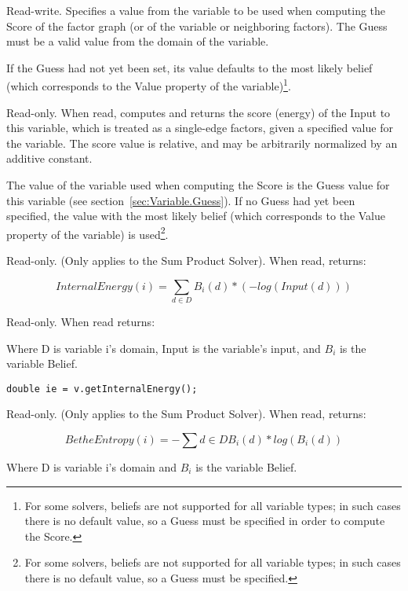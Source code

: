 Read-write.  Specifies a value from the variable to be used when computing the Score of the factor graph (or of the variable or neighboring factors).  The Guess must be a valid value from the domain of the variable.

If the Guess had not yet been set, its value defaults to the most likely belief (which corresponds to the Value property of the variable)\footnote{For some solvers, beliefs are not supported for all variable types; in such cases there is no default value, so a Guess must be specified in order to compute the Score.}.


\label{sec:Variable.Score}

Read-only.  When read, computes and returns the score (energy) of the Input to this variable, which is treated as a single-edge factors, given a specified value for the variable.  The score value is relative, and may be arbitrarily normalized by an additive constant.

The value of the variable used when computing the Score is the Guess value for this variable (see section~\ref{sec:Variable.Guess}).  If no Guess had yet been specified, the value with the most likely belief (which corresponds to the Value property of the variable) is used\footnote{For some solvers, beliefs are not supported for all variable types; in such cases there is no default value, so a Guess must be specified.}.


\label{sec:Variable.InternalEnergy}

Read-only.  (Only applies to the Sum Product Solver).  When read, returns:

\[
InternalEnergy(i) = \sum_{d \in D}B_i(d)*(-log(Input(d))) 
\]

Read-only.  When read returns:

Where D is variable i's domain, Input is the variable's input, and $B_i$ is the variable Belief.

\ifjava
\begin{lstlisting}
double ie = v.getInternalEnergy();
\end{lstlisting}
\fi

\label{sec:Variable.BetheEntropy}

Read-only.  (Only applies to the Sum Product Solver).  When read, returns:

\[
BetheEntropy(i) = - \sum{d \in D}B_i(d)*log(B_i(d))
\]

Where D is variable i's domain and $B_i$ is the variable Belief.

